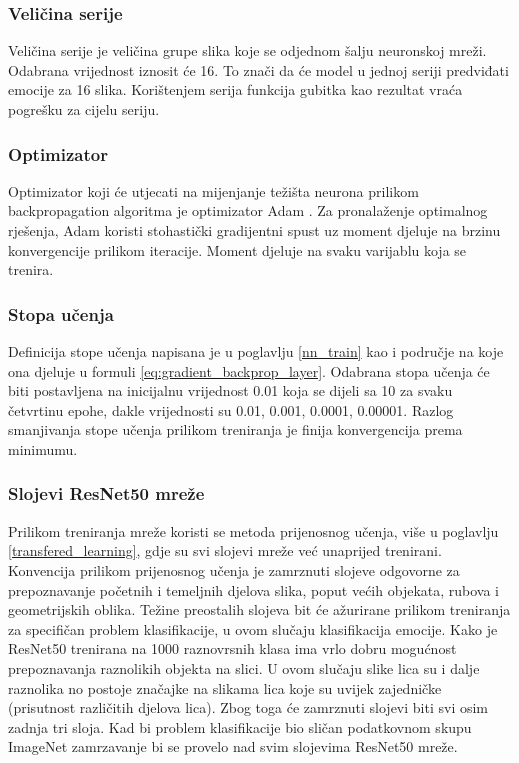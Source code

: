 \documentclass[times, utf8, zavrsni,numeric,pstricks]{fer}
\begin{document}
\subsubsection{Veličina serije}
Veličina serije  je veličina grupe slika koje se odjednom šalju neuronskoj mreži. Odabrana vrijednost iznosit će 16. To znači da će model u jednoj seriji predviđati emocije za 16 slika. Korištenjem serija funkcija gubitka kao rezultat vraća pogrešku za cijelu seriju.

\subsubsection{Optimizator}
Optimizator koji će utjecati na mijenjanje težišta neurona prilikom backpropagation algoritma je optimizator Adam \cite{adam}. Za pronalaženje optimalnog rješenja, Adam koristi stohastički gradijentni spust uz moment djeluje na brzinu konvergencije prilikom iteracije. Moment djeluje na svaku varijablu koja se trenira. 
 
\subsubsection{Stopa učenja}

Definicija stope učenja napisana je u poglavlju \ref{nn_train} kao i područje na koje ona djeluje u formuli \ref{eq:gradient_backprop_layer}. Odabrana stopa učenja će biti postavljena na inicijalnu vrijednost 0.01 koja se dijeli sa 10 za svaku četvrtinu epohe, dakle vrijednosti su 0.01, 0.001, 0.0001, 0.00001. Razlog smanjivanja stope učenja prilikom treniranja je finija konvergencija prema minimumu.


\subsubsection{Slojevi ResNet50 mreže}
Prilikom treniranja mreže koristi se metoda prijenosnog učenja, više u poglavlju \ref{transfered_learning}, gdje su svi slojevi mreže već unaprijed trenirani. Konvencija prilikom prijenosnog učenja je zamrznuti slojeve odgovorne za prepoznavanje početnih i temeljnih djelova slika, poput većih objekata, rubova i geometrijskih oblika. Težine preostalih slojeva bit će ažurirane prilikom treniranja za specifičan problem klasifikacije, u ovom slučaju klasifikacija emocije. Kako je ResNet50 trenirana na 1000 raznovrsnih klasa ima vrlo dobru mogućnost prepoznavanja raznolikih objekta na slici. U ovom slučaju slike lica su i dalje raznolika no postoje značajke na slikama lica koje su uvijek zajedničke (prisutnost različitih djelova lica). Zbog toga će zamrznuti slojevi biti svi osim zadnja tri sloja. Kad bi problem klasifikacije bio sličan podatkovnom skupu ImageNet zamrzavanje bi se provelo nad svim slojevima ResNet50 mreže.
\end{document}
